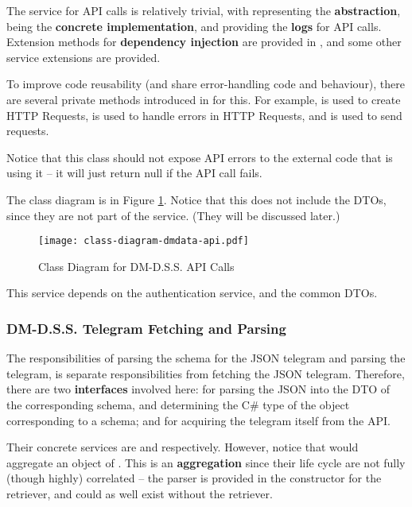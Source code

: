The service for API calls is relatively trivial, with  representing the \textbf{abstraction},  being the \textbf{concrete implementation}, and  providing the \textbf{logs} for API calls. Extension methods for \textbf{dependency injection} are provided in , and some other service extensions are provided.

To improve code reusability (and share error-handling code and behaviour), there are several private methods introduced in  for this. For example,  is used to create HTTP Requests,  is used to handle errors in HTTP Requests, and  is used to send requests.

Notice that this class should not expose API errors to the external code that is using it -- it will just return null if the API call fails.

The class diagram is in Figure \ref{fig:class-diagram-dmdata-api}. Notice that this does not include the DTOs, since they are not part of the service. (They will be discussed later.)

\begin{figure}[htp]
    \centering
    \texttt{[image: class-diagram-dmdata-api.pdf]}
    \caption{Class Diagram for DM-D.S.S. API Calls}
    \label{fig:class-diagram-dmdata-api}
\end{figure}

This service depends on the authentication service, and the common DTOs.

\subsubsection{DM-D.S.S. Telegram Fetching and Parsing}

The responsibilities of parsing the schema for the JSON telegram and parsing the telegram, is separate responsibilities from fetching the JSON telegram. Therefore, there are two \textbf{interfaces} involved here:  for parsing the JSON into the DTO of the corresponding schema, and determining the C\# type of the object corresponding to a schema; and  for acquiring the telegram itself from the API.

Their concrete services are  and  respectively. However, notice that  would aggregate an object of . This is an \textbf{aggregation} since their life cycle are not fully (though highly) correlated -- the parser is provided in the constructor for the retriever, and could as well exist without the retriever.

